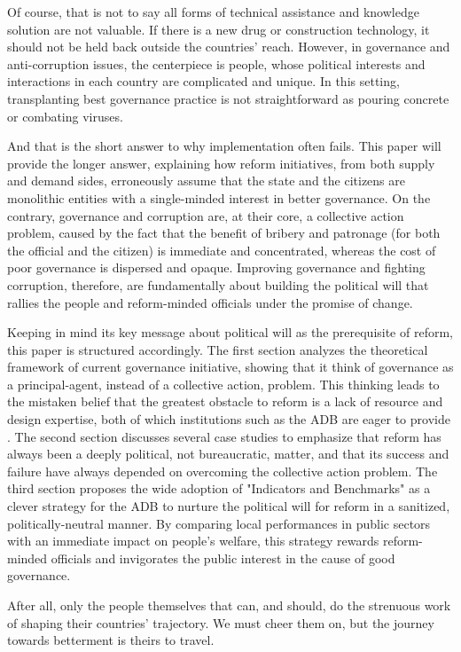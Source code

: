 \documentclass[12pt]{article}
\begin{document}
Of course, that is not to say all forms of technical assistance and knowledge solution are not valuable. If there is a new drug or construction technology, it should not be held back outside the countries' reach. However, in governance and anti-corruption issues, the centerpiece is people, whose political interests and interactions in each country are complicated and unique. In this setting, transplanting best governance practice is not straightforward as pouring concrete or combating viruses.

And that is the short answer to why implementation often fails. This paper will provide the longer answer, explaining how reform initiatives, from both supply and demand sides, erroneously assume that the state and the citizens are monolithic entities with a single-minded interest in better governance. On the contrary, governance and corruption are, at their core, a collective action problem, caused by the fact that the benefit of bribery and patronage (for both the official and the citizen) is immediate and concentrated, whereas the cost of poor governance is dispersed and opaque. Improving governance and fighting corruption, therefore, are fundamentally about building the political will that rallies the people and reform-minded officials under the promise of change.

Keeping in mind its key message about political will as the prerequisite of reform, this paper is structured accordingly. The first section analyzes the theoretical framework of current governance initiative, showing that it think of governance as a principal-agent, instead of a collective action, problem. This thinking leads to the mistaken belief that the greatest obstacle to reform is a lack of resource and design expertise, both of which institutions such as the ADB are eager to provide \citep[16]{GlobalIntegrity2012}. The second section discusses several case studies to emphasize that reform has always been a deeply political, not bureaucratic, matter, and that its success and failure have always depended on overcoming the collective action problem. The third section proposes the wide adoption of "Indicators and Benchmarks" as a clever strategy for the ADB to nurture the political will for reform in a sanitized, politically-neutral manner. By comparing local performances in public sectors with an immediate impact on people's welfare, this strategy rewards reform-minded officials and invigorates the public interest in the cause of good governance.

After all, only the people themselves that can, and should, do the strenuous work of shaping their countries' trajectory. We must cheer them on, but the journey towards betterment is theirs to travel.
\end{document}
